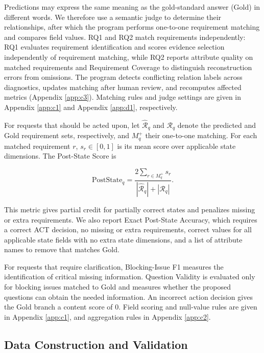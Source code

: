 \documentclass{article} %
\begin{document}
Predictions may express the same meaning as the gold-standard answer (Gold) in different words. We therefore use a semantic judge to determine their relationships, after which the program performs one-to-one requirement matching and compares field values. RQ1 and RQ2 match requirements independently: RQ1 evaluates requirement identification and scores evidence selection independently of requirement matching, while RQ2 reports attribute quality on matched requirements and Requirement Coverage to distinguish reconstruction errors from omissions. The program detects conflicting relation labels across diagnostics, updates matching after human review, and recomputes affected metrics (Appendix \ref{app:c3}). Matching rules and judge settings are given in Appendix \ref{app:c1} and Appendix \ref{app:d1}, respectively.

\noindent\begin{minipage}{\linewidth}
For requests that should be acted upon, let $\widehat{\mathcal R}_q$ and $\mathcal R_q$ denote the predicted and Gold requirement sets, respectively, and $M_q^+$ their one-to-one matching. For each matched requirement $r$, $s_r\in[0,1]$ is its mean score over applicable state dimensions. The Post-State Score is

\begin{equation}
\mathrm{PostState}_q=
\frac{2\sum_{r\in M_q^+}s_r}
{|\widehat{\mathcal R}_q|+|\mathcal R_q|}.
\label{eq:post-state-score}
\end{equation}
\end{minipage}

This metric gives partial credit for partially correct states and penalizes missing or extra requirements. We also report Exact Post-State Accuracy, which requires a correct ACT decision, no missing or extra requirements, correct values for all applicable state fields with no extra state dimensions, and a list of attribute names to remove that matches Gold.

For requests that require clarification, Blocking-Issue F1 measures the identification of critical missing information. Question Validity is evaluated only for blocking issues matched to Gold and measures whether the proposed questions can obtain the needed information. An incorrect action decision gives the Gold branch a content score of 0. Field scoring and null-value rules are given in Appendix \ref{app:c1}, and aggregation rules in Appendix \ref{app:c2}.

\subsection{Data Construction and Validation}
\label{sec:construction}
\end{document}
